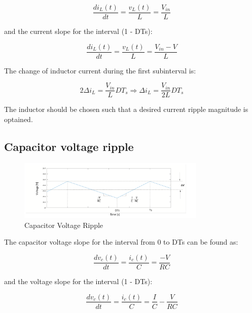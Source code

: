\begin{equation}
	\frac{di_L(t)}{dt} = \frac{v_L(t)}{L} = \frac{V_{in}}{L}
	\label{eq:CBC_ICR1}
\end{equation}

and the current slope for the interval (1 - DTs):

\begin{equation}
	\frac{di_L(t)}{dt} = \frac{v_L(t)}{L} = \frac{V_{in} - V}{L}
	\label{eq:CBC_ICR2}
\end{equation}

The change of inductor current during the first subinterval is:

\begin{equation}
	2\Delta i_L = \frac{V_{in}}{L}DT_s \Rightarrow
  \Delta i_L = \frac{V_{in}}{2L}DT_s
	\label{eq:CBC_ICR3}
\end{equation}

The inductor should be chosen such that a desired current ripple magnitude is optained.

\subsection{Capacitor voltage ripple}\label{sec:CBC_CVR}

\begin{figure}[H]
   \centering
   \includegraphics[width=0.8\textwidth]{figures/aConventionalBoost/CapacitorVoltage.pdf}
    \caption{Capacitor Voltage Ripple}
	\label{fig:CBC_CVR1}
\end{figure}

The capacitor voltage slope for the interval from 0 to DTs can be found as:

\begin{equation}
	\frac{dv_c(t)}{dt} = \frac{i_c(t)}{C} = \frac{-V}{RC}
	\label{eq:CBC_CVR2}
\end{equation}

and the voltage slope for the interval (1 - DTs):

\begin{equation}
	\frac{dv_c(t)}{dt} = \frac{i_c(t)}{C} = \frac{I}{C} - \frac{V}{RC}
	\label{eq:CBC_CVR3}
\end{equation}

